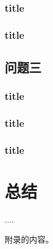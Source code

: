 \documentclass{cumcmthesis}
\begin{document}
			\subsubsection{title}
			\subsubsection{title}
		\subsection{问题三}
			\subsubsection{title}
			\subsubsection{title}
			\subsubsection{title}
	\section{总结}
	\begin{thebibliography}{9}%
		 ....
	\end{thebibliography}
	\begin{appendices}
		附录的内容。
	\end{appendices}
\end{document}
